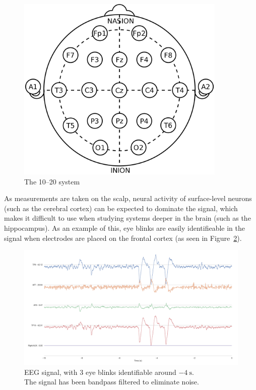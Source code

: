     \begin{figure}
        \begin{center}
            \includegraphics[width=10cm]{img/1020system.png}
        \end{center}
        \caption{The 10–20 system}\label{fig:1020}
    \end{figure}

    As measurements are taken on the scalp, neural activity of surface-level neurons (such as the cerebral cortex) can be expected to dominate the signal, which makes it difficult to use when studying systems deeper in the brain (such as the hippocampus). As an example of this, eye blinks are easily identifieable in the signal when electrodes are placed on the frontal cortex (as seen in Figure~\ref{fig:raweeg}).



    \begin{figure}
        \begin{center}
            \includegraphics[trim=60 50 50 60,clip,width=24cm]{img/raw-signal.png}
        \end{center}
        \caption{EEG signal, with 3 eye blinks identifiable around $\SI{-4}{\second}$.\\ The signal has been bandpass filtered to eliminate noise.}\label{fig:raweeg}
    \end{figure}

